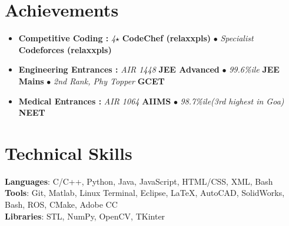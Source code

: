 \documentclass[a4paper,11pt]{article}
\newcommand*{\cvrank}[2]{\footnotesize{\textit{#1} \textbf{#2} $\bullet$}}
\newcommand*{\cvrankend}[2]{\footnotesize{\textit{#1} \textbf{#2} \\ }
}
\begin{document}
  \section{Achievements}
   \begin{itemize}[leftmargin=0.15in, label={}]
      \item{ \small{
        \textbf{Competitive Coding :}
        \cvrank{4\hspace{1pt}$\star$}{CodeChef (relaxxpls)}
        \cvrankend{Specialist}{Codeforces (relaxxpls)}
      }} \vspace{-.5mm}
      \item{ \small{
        \textbf{Engineering Entrances :}
        \cvrank{AIR 1448}{JEE Advanced}
        \cvrank{99.6\hspace{1pt}\%\hspace{1pt}ile}{JEE Mains}
        \cvrankend{2\hspace{1pt}nd Rank, Phy Topper}{GCET}
      }} \vspace{-.5mm}
      \item{ \small{
        \textbf{Medical Entrances :}
        \cvrank{AIR 1064}{AIIMS}
        \cvrankend{98.7\hspace{1pt}\%\hspace{1pt}ile\hspace{2pt}(3rd highest in Goa)}{NEET}
      }} \vspace{-0mm}
   \end{itemize}

  \section{Technical Skills}
   \begin{itemize}[leftmargin=0.15in, label={}]
      \small{\item{
       \textbf{Languages}{: C/C++, Python, Java, JavaScript, HTML/CSS, XML, Bash} \\
       \textbf{Tools}{: Git, Matlab, Linux Terminal, Eclipse, \LaTeX, AutoCAD, SolidWorks, Bash, ROS, CMake, Adobe CC} \\
       \textbf{Libraries}{: STL, NumPy, OpenCV, TKinter} 
      }}
   \end{itemize}
\end{document}
